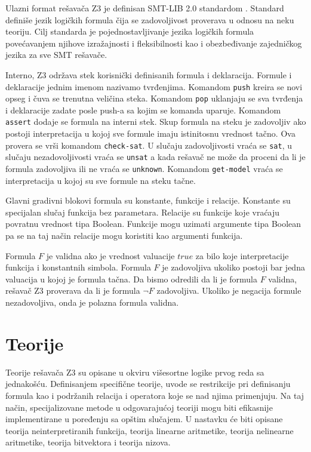 \documentclass[12pt,oneside]{memoir}
\begin{document}
Ulazni format rešavača Z3 je definisan SMT-LIB 2.0 standardom \cite{SMTLIB}. Standard definiše jezik logičkih formula čija se zadovoljivost proverava u odnosu na neku teoriju. Cilj standarda je pojednostavljivanje jezika logičkih formula povećavanjem njihove izražajnosti i fleksibilnosti kao i obezbeđivanje zajedničkog jezika za sve SMT rešavače. 
\par
Interno, Z3 održava stek korisnički definisanih formula i deklaracija. Formule i deklaracije jednim imenom nazivamo tvrđenjima. Komandom \texttt{push} kreira se novi opseg i čuva se trenutna veličina steka. Komandom \texttt{pop} uklanjaju se sva tvrđenja i deklaracije zadate posle push-a sa kojim se komanda uparuje. Komandom \texttt{assert} dodaje se formula na interni stek. Skup formula na steku je zadovoljiv ako postoji interpretacija u kojoj sve formule imaju istinitosnu vrednost tačno. Ova provera se vrši komandom \texttt{check-sat}. U slučaju zadovoljivosti vraća se \texttt{sat}, u slučaju nezadovoljivosti vraća se \texttt{unsat} a kada rešavač ne može da proceni da li je formula zadovoljiva ili ne vraća se \texttt{unknown}. Komandom \texttt{get-model} vraća se interpretacija u kojoj su sve formule na steku tačne. 
\par
Glavni gradivni blokovi formula su konstante, funkcije i relacije. Konstante su specijalan slučaj funkcija bez parametara. Relacije su funkcije koje vraćaju povratnu vrednost tipa Boolean. Funkcije mogu uzimati argumente tipa Boolean pa se na taj način relacije mogu koristiti kao argumenti funkcija.  


Formula $F$ je validna ako je vrednost valuacije $true$ za bilo koje interpretacije funkcija i konstantnih simbola. Formula $F$ je zadovoljiva ukoliko postoji bar jedna valuacija u kojoj je formula tačna. Da bismo odredili da li je formula $F$ validna, rešavač Z3 proverava da li je formula $\lnot F$ zadovoljiva. Ukoliko je negacija formule nezadovoljiva, onda je polazna formula validna. 

 

\section{Teorije} \label{sec:num2}
Teorije rešavača Z3 su opisane u okviru višesortne logike prvog reda sa jednakošću.  Definisanjem specifične teorije, uvode se restrikcije pri definisanju formula kao i podržanih relacija i operatora koje se nad njima primenjuju. Na taj način, specijalizovane metode u odgovarajućoj teoriji mogu biti efikasnije implementirane u poređenju sa opštim slučajem. U nastavku će biti opisane teorija neinterpretiranih funkcija, teorija linearne aritmetike, teorija nelinearne aritmetike, teorija bitvektora i teorija nizova.
\end{document}
